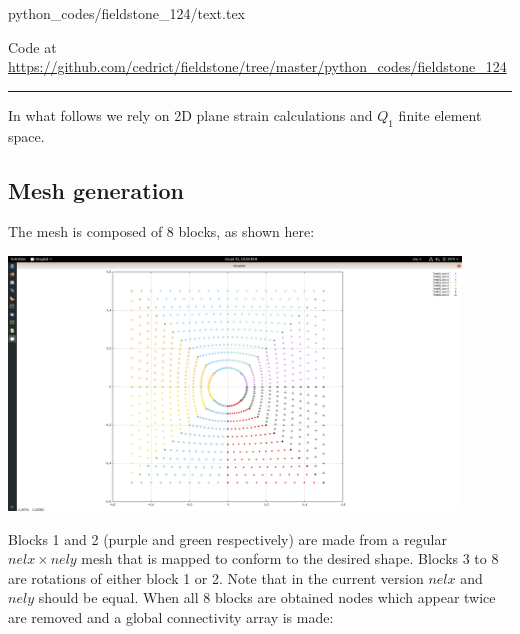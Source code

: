 \begin{flushright} {\tiny {\color{gray} python\_codes/fieldstone\_124/text.tex}} \end{flushright}



\begin{center}

Code at \url{https://github.com/cedrict/fieldstone/tree/master/python_codes/fieldstone_124}
\end{center}

\par\noindent\rule{\textwidth}{0.4pt}


In what follows we rely on 2D plane strain calculations and $Q_1$ finite element space.


\subsection*{Mesh generation}

The mesh is composed of 8 blocks, as shown here:

\begin{center}
\includegraphics[width=12cm]{python_codes/fieldstone_124/results/mesh1}
\end{center}

Blocks 1 and 2 (purple and green respectively) are made from a regular $nelx\times nely$ mesh that is 
mapped to conform to the desired shape. Blocks 3 to 8 are rotations 
of either block 1 or 2. Note that in the current version $nelx$ and
$nely$ should be equal.
When all 8 blocks are obtained nodes which appear twice are removed
and a global connectivity array is made: 

